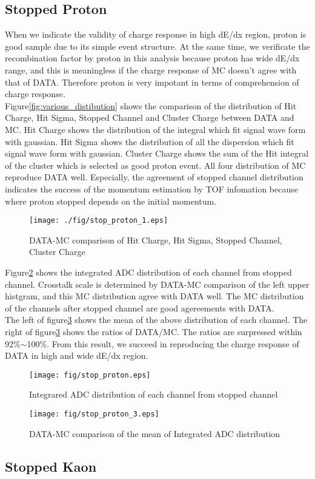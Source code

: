 \subsection{Stopped Proton}

When we indicate the validity of charge response in high dE/dx region, proton is good sample due to its simple event structure.
At the same time, we verificate the recombination factor by proton in this analysis because proton has wide dE/dx range, and this is meaningless if the charge response of MC doesn't agree with that of DATA.
Therefore proton is very impotant in terms of comprehension of charge response.\\
Figure\ref{fig:various_distibution} shows the comparison of the distribution of Hit Charge, Hit Sigma, Stopped Channel and  Cluster Charge between DATA and MC.
Hit Charge shows the distribution of the integral which fit signal wave form  with gaussian.
Hit Sigma shows the distribution of all the dispersion which fit signal wave form with gaussian.
Cluster Charge shows the sum of the Hit integral of the cluster which is selected as good proton event.
All four distribution of MC reproduce DATA well.
Especially, the agreement of stopped channel distribution indicates the success of the momentum estimation by TOF infomation because where proton stopped depends on the initial momentum.\\

\begin{figure}[htbp]
  \centering
  \texttt{[image: ./fig/stop\_proton\_1.eps]}
  \caption{DATA-MC comparison of Hit Charge, Hit Sigma, Stopped Channel, Cluster Charge}
  \label{fig:varios_distribution}
\end{figure}

Figure\ref{fig:ADC_distribution} shows the integrated ADC distribution of each channel from stopped channel.
Crosstalk scale is determined by DATA-MC comparison of the left upper histgram,
and this MC distribution agree with DATA well.
The MC distribution of the channels after stopped channel are good agereements with DATA.\\
The left of figure\ref{fig:Mean_comparison} shows the mean of the above distribution of each channel.
The right of figure\ref{fig:Mean_comparison} shows the ratios of DATA/MC.
The ratios are surpressed within 92\%$\sim$100\%.
From this result, we succeed in reproducing the charge response of DATA in high and wide dE/dx region.

\begin{figure}[htbp]
  \centering
  \texttt{[image: fig/stop\_proton.eps]}
  \caption{Integrared ADC distribution of each channel from stopped channel}
  \label{fig:ADC_distribution}
\end{figure}

\begin{figure}[htbp]
  \centering
  \texttt{[image: fig/stop\_proton\_3.eps]}
  \caption{DATA-MC comparison of the mean of Integrated ADC distribution}
  \label{fig:Mean_comparison}
\end{figure}

\subsection{Stopped Kaon}
